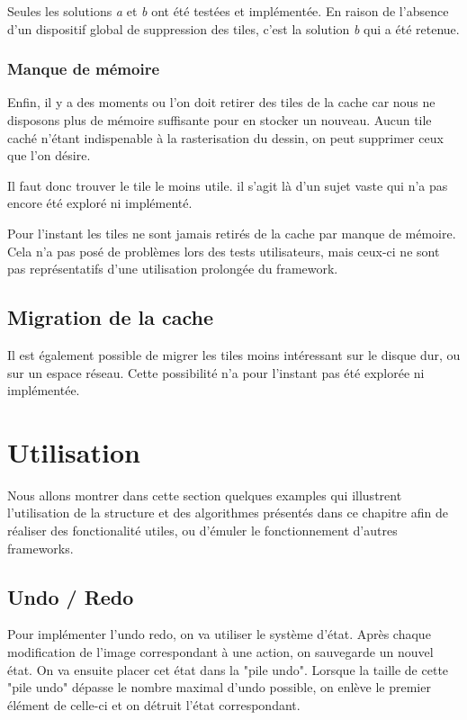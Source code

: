 			Seules les solutions \emph{a} et \emph{b} ont été testées et implémentée. En raison de l'absence d'un dispositif global de suppression
			des tiles, c'est la solution \emph{b} qui a été retenue. 

			\subsubsection{Manque de mémoire}
			Enfin, il y a des moments ou l'on doit retirer des tiles de la cache car nous ne disposons plus de mémoire suffisante
			pour en stocker un nouveau. Aucun tile caché n'étant indispenable à la rasterisation du dessin, on peut supprimer ceux que l'on désire.
			
			Il faut donc trouver le tile le moins utile. il s'agit là d'un sujet vaste qui n'a pas encore été exploré
			ni implémenté. 
			
			Pour l'instant les tiles ne sont jamais retirés de la cache par manque de mémoire. Cela n'a pas posé de problèmes lors
			des tests utilisateurs, mais ceux-ci ne sont pas représentatifs d'une utilisation prolongée du framework. 

		\subsection{Migration de la cache}
			Il est également possible de migrer les tiles moins intéressant sur le disque dur, ou sur un espace réseau.
			Cette possibilité n'a pour l'instant pas été explorée ni implémentée.

	\section{Utilisation}
		Nous allons montrer dans cette section quelques examples qui illustrent l'utilisation de la structure et des algorithmes présentés
		dans ce chapitre afin de réaliser des fonctionalité utiles, ou d'émuler le fonctionnement d'autres frameworks. 
		\subsection{Undo / Redo}
			Pour implémenter l'undo redo, on va utiliser le système d'état. Après chaque modification de l'image correspondant à une action,
			on sauvegarde un nouvel état. On va ensuite placer cet état dans la "pile undo". 
			Lorsque la taille de cette "pile undo" dépasse le nombre maximal d'undo possible, on enlève le premier élément de celle-ci 
			et on détruit l'état correspondant. 


